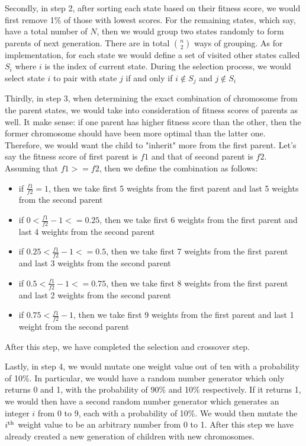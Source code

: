 \documentclass[letterpaper]{article} %
\begin{document}
\begin{itemize}
  Secondly, in step 2, after sorting each state based on their fitness score, we would first remove 1\% of those with lowest scores. For the remaining states, which say, have a total number of $N$, then we would group two states randomly to form parents of next generation. There are in total ${n \choose 2}$ ways of grouping. As for implementation, for each state we would define a set of visited other states called $S_{i}$ where $i$ is the index of current state. During the selection process, we would select state $i$ to pair with state $j$ if and only if $i \not\in S_{j}$ and $j \not\in S_{i}$
  
  Thirdly, in step 3, when determining the exact combination of chromosome from the parent states, we would take into consideration of fitness scores of parents as well. It make sense: if one parent has higher fitness score than the other, then the former chromosome should have been more optimal than the latter one. Therefore, we would want the child to "inherit" more from the first parent. Let's say the fitness score of first parent is $f1$ and that of second parent is $f2$. Assuming that $f1 >= f2$, then we define the combination as follows:
  
  \begin{itemize}
      \item if $\frac{f1}{f2} = 1$, then we take first 5 weights from the first parent and last 5 weights from the second parent
      \item if $0 < \frac{f1}{f2} - 1 <= 0.25$, then we take first 6 weights from the first parent and last 4 weights from the second parent
      \item if $0.25 < \frac{f1}{f2} - 1 <= 0.5$, then we take first 7 weights from the first parent and last 3 weights from the second parent
      \item if $0.5 < \frac{f1}{f2} - 1 <= 0.75$, then we take first 8 weights from the first parent and last 2 weights from the second parent
      \item if $0.75 < \frac{f1}{f2} - 1$, then we take first 9 weights from the first parent and last 1 weight from the second parent
  \end{itemize}

  After this step, we have completed the selection and crossover step. 
  
  Lastly, in step 4, we would mutate one weight value out of ten with a probability of 10\%. In particular, we would have a random number generator which only returns 0 and 1, with the probability of 90\% and 10\% respectively. If it returns 1, we would then have a second random number generator which generates an integer $i$ from 0 to 9, each with a probability of 10\%. We would then mutate the $i\textsuperscript{th}$ weight value to be an arbitrary number from 0 to 1. After this step we have already created a new generation of children with new chromosomes.


\end{itemize}
\end{document}
